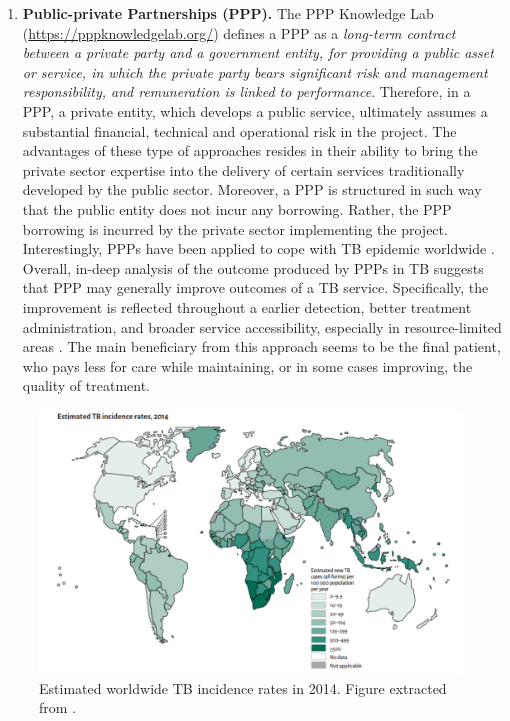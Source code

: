 \documentclass[11pt, b5paper,twoside]{tesi_upf}
\begin{document}
\begin{enumerate}
\item \textbf{Public-private Partnerships (PPP).} The PPP Knowledge Lab (\url{https://pppknowledgelab.org/}) defines a PPP as a \textit{long-term contract between a private party and a government entity, for providing a public asset or service, in which the private party bears significant risk and management responsibility, and remuneration is linked to performance}. Therefore, in a PPP, a private entity, which develops a public service, ultimately assumes a substantial financial, technical and operational risk in the project. The advantages of these type of approaches resides in their ability to bring the private sector expertise into the delivery of certain services traditionally developed by the public sector. Moreover, a PPP is structured in such way that the public entity does not incur any borrowing. Rather, the PPP borrowing is incurred by the private sector implementing the project. Interestingly,  PPPs have been applied to cope with TB epidemic worldwide \cite{Karki2007, Murthy2001}. Overall, in-deep analysis of the outcome produced by PPPs in TB suggests that PPP may generally improve outcomes of a TB service.  Specifically, the improvement is reflected throughout a earlier detection, better treatment administration, and broader service accessibility, especially in resource-limited areas \cite{Lei2015}. The main beneficiary from this approach seems to be the final patient, who pays less for care while maintaining, or in some cases improving, the quality of treatment. 

\end{enumerate}

\begin{figure}[htbp]
\centering
\includegraphics[width=0.9\linewidth]{../figures/map_incidence_tb.pdf}
	\caption[Estimated worldwide TB incidence rates in 2014]{Estimated worldwide TB incidence rates in 2014. Figure extracted from \cite{Lewandowski2015}.}
\label{fig:map_incidence_tb}
	
	\vspace*{4mm}
\end{figure}
\end{document}
